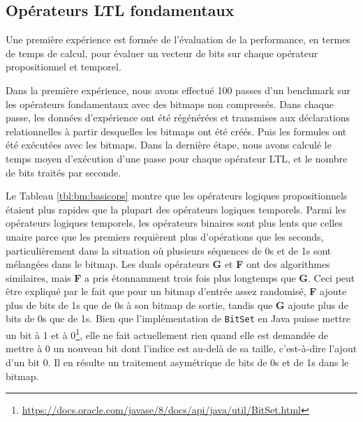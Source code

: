 \subsection{Opérateurs LTL fondamentaux} %

Une première expérience est formée de l'évaluation de la performance, en termes de temps de calcul, pour évaluer un vecteur de bits sur chaque opérateur propositionnel et temporel.

Dans la première expérience, nous avons effectué 100 passes d'un benchmark sur les opérateurs fondamentaux avec des bitmaps non compressés. Dans chaque passe, les données d'expérience ont été régénérées et transmises aux déclarations relationnelles à partir desquelles les bitmaps ont été créés. Puis les formules ont été exécutées avec les bitmaps. Dans la dernière étape, nous avons calculé le temps moyen d'exécution d'une passe pour chaque opérateur LTL, et le nombre de bits traités par seconde.

Le Tableau \ref{tbl:bm:basicops} montre que les opérateurs logiques propositionnels étaient plus rapides que la plupart des opérateurs logiques temporels. Parmi les opérateurs logiques temporels, les opérateurs binaires sont plus lents que celles unaire parce que les premiers requièrent plus d'opérations que les seconds, particulièrement dans la situation où plusieurs séquences de 0s et de 1s sont mélangées dans le bitmap. Les duals opérateurs \textbf{G} et \textbf{F} ont des algorithmes similaires, mais \textbf{F} a pris étonnamment trois fois plus longtemps que \textbf {G}. Ceci peut être expliqué par le fait que pour un bitmap d'entrée assez randomisé, \textbf{F} ajoute plus de bits de 1s que de 0s à son bitmap de sortie, tandis que \textbf{G} ajoute plus de bits de 0s que de 1s. Bien que l'implémentation de \texttt{BitSet} en Java puisse mettre un bit à 1 et à 0\footnote{\url{https://docs.oracle.com/javase/8/docs/api/java/util/BitSet.html}}, elle ne fait actuellement rien quand elle est demandée de mettre à 0 un nouveau bit dont l'indice est au-delà de sa taille, c'est-à-dire l'ajout d'un bit 0. Il en résulte un traitement asymétrique de bits de 0s et de 1s dans le bitmap.

